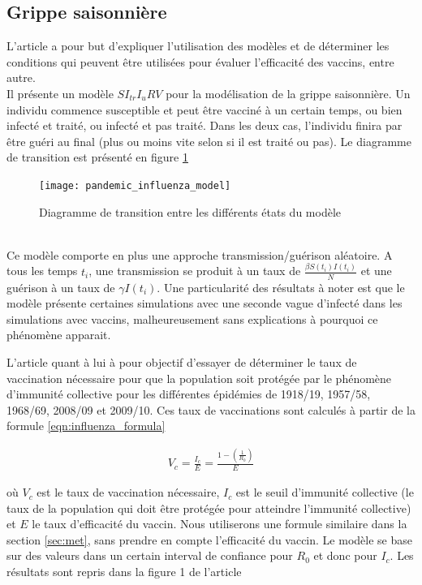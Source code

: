 \documentclass[journal, a4paper]{IEEEtran}
\begin{document}
	\subsection{Grippe saisonnière}
		L'article \cite{pandemic_influenza} a pour but d'expliquer l'utilisation des modèles et de déterminer les conditions qui peuvent être utilisées pour évaluer l'efficacité des vaccins, entre autre. \\
		Il présente un modèle $SI_{tr}I_uRV$ pour la modélisation de la grippe saisonnière. Un individu commence susceptible et peut être vacciné à un certain temps, ou bien infecté et traité, ou infecté et pas traité. Dans les deux cas, l'individu finira par être guéri au final (plus ou moins vite selon si il est traité ou pas). Le diagramme de transition est présenté en figure \ref{fig:pandemic_influenza_model}
		\begin{figure}[!hbt]
			\caption{Diagramme de transition entre les différents états du modèle}
			\texttt{[image: pandemic\_influenza\_model]}
			\label{fig:pandemic_influenza_model}
			\cite{pandemic_influenza}
		\end{figure} \\
		Ce modèle comporte en plus une approche transmission/guérison aléatoire. A tous les temps $t_i$, une transmission se produit à un taux de $\frac{\beta S(t_i)I(t_i)}{N}$ et une guérison à un taux de $\gamma I(t_i)$. Une particularité des résultats à noter est que le modèle présente certaines simulations avec une seconde vague d'infecté dans les simulations avec vaccins, malheureusement sans explications à pourquoi ce phénomène apparait.


		 L'article \cite{influenza_HIT} quant à lui à pour objectif d'essayer de déterminer le taux de vaccination nécessaire pour que la population soit protégée par le phénomène d'immunité collective pour les différentes épidémies de 1918/19, 1957/58, 1968/69, 2008/09 et 2009/10. Ces taux de vaccinations sont calculés à partir de la formule \ref{eqn:influenza_formula}

		 \begin{equation}
		 \label{eqn:influenza_formula}
		 	\begin{aligned}
		 		V_c = \frac{I_c}{E} = \frac{1-(\frac{1}{R_0})}{E}
		 	\end{aligned}
		 \end{equation}

		 où $V_c$ est le taux de vaccination nécessaire, $I_c$ est le seuil d'immunité collective (le taux de la population qui doit être protégée pour atteindre l'immunité collective) et $E$ le taux d'efficacité du vaccin. Nous utiliserons une formule similaire dans la section \ref{sec:met}, sans prendre en compte l'efficacité du vaccin. Le modèle se base sur des valeurs dans un certain interval de confiance pour $R_0$ et donc pour $I_c$. Les résultats sont repris dans la figure 1 de l'article \cite{influenza_HIT}
\end{document}
